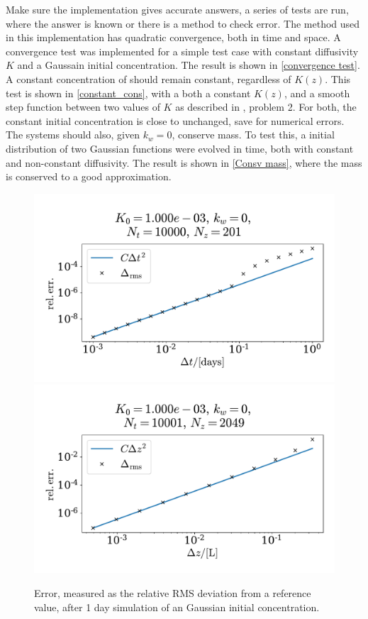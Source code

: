 \documentclass{article}
\begin{document}
    Make sure the implementation gives accurate answers, a series of tests are run, where the answer is known or there is a method to check error. The method used in this implementation has quadratic convergence, both in time and space. A convergence test was implemented for a simple test case with constant diffusivity $K$ and a Gaussain initial concentration. The result is shown in \autoref{convergence test}. A constant concentration of  should remain constant, regardless of $K(z)$. This test is shown in \autoref{constant_cons}, with a both a constant $K(z)$, and a smooth step function between two values of $K$ as described in \cite{exercise}, problem 2. For both, the constant initial concentration is close to unchanged, save for numerical errors. The systems should also, given $k_w=0$, conserve mass. To test this, a initial distribution of two Gaussian functions were evolved in time, both with constant and non-constant diffusivity. The result is shown in \autoref{Consv mass}, where the mass is conserved to a good approximation.
    
    
    \begin{figure}[H]
        \centering
        \includegraphics[width=.49\textwidth]{../plots/conv_test_t}
        \includegraphics[width=.49\textwidth]{../plots/conv_test_z}
        \caption{Error, measured as the relative RMS deviation from a reference value, after 1 day simulation of an Gaussian initial concentration.}
        \label{convergence test}
    \end{figure}
\end{document}
